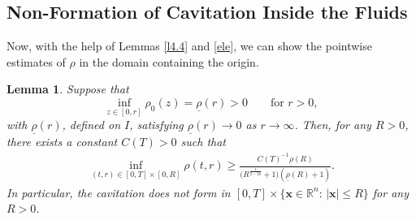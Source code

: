 \documentclass[11pt,reqno]{amsart}
\newtheorem{lem}{Lemma}[section]
\numberwithin{rk}{section}
\numberwithin{prop}{section}
\numberwithin{mydef}{section}
\numberwithin{lem}{section}
\numberwithin{equation}{section}
\numberwithin{thm}{section}
\begin{document}
\subsection{Non-Formation of Cavitation Inside the Fluids}
Now, with the help of Lemmas \ref{l4.4} and \ref{ele}, we can show the pointwise estimates of $\rho$  
in the domain containing the origin.


\begin{lem}\label{lemma-inf-rho}
 Suppose that 
\begin{equation}\label{inf-rho0}
\inf_{z\in[0,r]}\rho_0(z)=\underline{\rho}(r)>0 \qquad\text{for $r>0$},
\end{equation}
with $\underline{\rho}(r)$, defined on $I$, satisfying $\underline{\rho}(r)\to 0$ as $r\to\infty$. 
Then,  for any  $R>0$, there exists a constant $C(T)>0$ such that 
\begin{equation*}
\begin{gathered}
\inf_{(t,r)\in [0,T]\times [0,R]} \rho(t,r)\geq \frac{C(T)^{-1}\underline{\rho}(R)}{\big(R^{\frac{1}{2-2\delta}}+1\big)(\underline{\rho}(R)+1)}.
\end{gathered}   
\end{equation*}
In particular, the cavitation does not form in $[0,T]\times \{\boldsymbol{x}\in\mathbb{R}^n:\,|\boldsymbol{x}|\leq R\}$ 
for any  $R>0$.
\end{lem}
\end{document}
